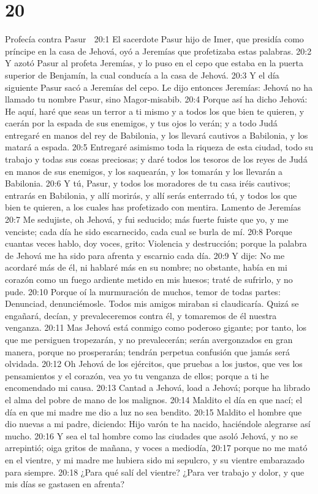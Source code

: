 \chapter{20}

Profecía contra Pasur  

20:1 El sacerdote Pasur hijo de Imer, que presidía como príncipe en la casa de Jehová, oyó a Jeremías que profetizaba estas palabras.  
20:2 Y azotó Pasur al profeta Jeremías, y lo puso en el cepo que estaba en la puerta superior de Benjamín, la cual conducía a la casa de Jehová.  
20:3 Y el día siguiente Pasur sacó a Jeremías del cepo. Le dijo entonces Jeremías: Jehová no ha llamado tu nombre Pasur, sino Magor-misabib.  
20:4 Porque así ha dicho Jehová: He aquí, haré que seas un terror a ti mismo y a todos los que bien te quieren, y caerán por la espada de sus enemigos, y tus ojos lo verán; y a todo Judá entregaré en manos del rey de Babilonia, y los llevará cautivos a Babilonia, y los matará a espada.  
20:5 Entregaré asimismo toda la riqueza de esta ciudad, todo su trabajo y todas sus cosas preciosas; y daré todos los tesoros de los reyes de Judá en manos de sus enemigos, y los saquearán, y los tomarán y los llevarán a Babilonia.  
20:6 Y tú, Pasur, y todos los moradores de tu casa iréis cautivos; entrarás en Babilonia, y allí morirás, y allí serás enterrado tú, y todos los que bien te quieren, a los cuales has profetizado con mentira.  
Lamento de Jeremías  
20:7 Me sedujiste, oh Jehová, y fui seducido; más fuerte fuiste que yo, y me venciste; cada día he sido escarnecido, cada cual se burla de mí.  
20:8 Porque cuantas veces hablo, doy voces, grito: Violencia y destrucción; porque la palabra de Jehová me ha sido para afrenta y escarnio cada día.  
20:9 Y dije: No me acordaré más de él, ni hablaré más en su nombre; no obstante, había en mi corazón como un fuego ardiente metido en mis huesos; traté de sufrirlo, y no pude.  
20:10 Porque oí la murmuración de muchos, temor de todas partes: Denunciad, denunciémosle. Todos mis amigos miraban si claudicaría. Quizá se engañará, decían, y prevaleceremos contra él, y tomaremos de él nuestra venganza.  
20:11 Mas Jehová está conmigo como poderoso gigante; por tanto, los que me persiguen tropezarán, y no prevalecerán; serán avergonzados en gran manera, porque no prosperarán; tendrán perpetua confusión que jamás será olvidada.  
20:12 Oh Jehová de los ejércitos, que pruebas a los justos, que ves los pensamientos y el corazón, vea yo tu venganza de ellos; porque a ti he encomendado mi causa.  
20:13 Cantad a Jehová, load a Jehová; porque ha librado el alma del pobre de mano de los malignos.  
20:14 Maldito el día en que nací; el día en que mi madre me dio a luz no sea bendito.  
20:15 Maldito el hombre que dio nuevas a mi padre, diciendo: Hijo varón te ha nacido, haciéndole alegrarse así mucho.  
20:16 Y sea el tal hombre como las ciudades que asoló Jehová, y no se arrepintió; oiga gritos de mañana, y voces a mediodía,  
20:17 porque no me mató en el vientre, y mi madre me hubiera sido mi sepulcro, y su vientre embarazado para siempre.  
20:18 ¿Para qué salí del vientre? ¿Para ver trabajo y dolor, y que mis días se gastasen en afrenta?  

